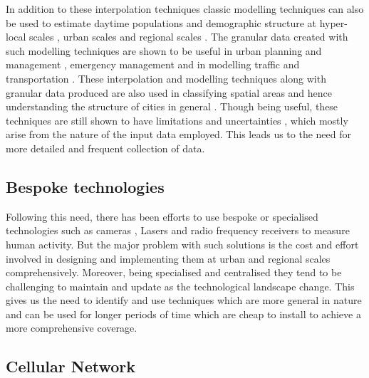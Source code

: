 In addition to these interpolation techniques classic modelling techniques can also be used to estimate daytime populations and demographic structure at hyper-local scales \citep{jochem2013, jia2014}, urban scales \citep{alahmadi2013, abowd2004} and regional scales \citep{foley1954, schmitt1956, singleton2015, mccormack2017}.
The granular data created with such modelling techniques are shown to be useful in urban planning and management \citep{parrott1999}, emergency management \citep{alexander2002, cutter2006} and in modelling traffic and transportation \citep{lefebvre2013}.
These interpolation and modelling techniques along with granular data produced are also used in classifying spatial areas and hence understanding the structure of cities in general \citep{mcmillen2001, mcmillen2004, lee2007, arribas-bel2014}.
Though being useful, these techniques are still shown to have limitations and uncertainties \citep{nagle2014}, which mostly arise from the nature of the input data employed.
This leads us to the need for more detailed and frequent collection of data.

\subsection{Bespoke technologies}

Following this need, there has been efforts to use bespoke or specialised technologies such as cameras \citep{cai1996, heikkila2004, krockel2012}, Lasers \citep{zhao2005, arras2008} and radio frequency receivers  \citep{bahl2000, yang2013, chothia2010, bulusu2000, dil2011} to measure human activity.
But the major problem with such solutions is the cost and effort involved in designing and implementing them at urban and regional scales comprehensively.
Moreover, being specialised and centralised they tend to be challenging to maintain and update as the technological landscape change.
This gives us the need to identify and use techniques which are more general in nature and can be used for longer periods of time which are cheap to install to achieve a more comprehensive coverage.

\subsection{Cellular Network}

